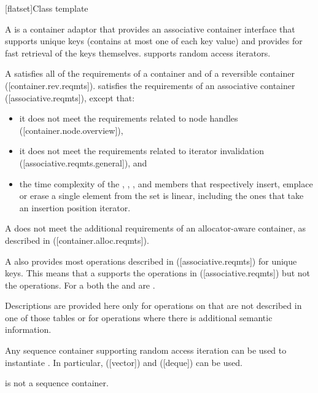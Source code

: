 \noindent\makebox[\linewidth]{\rule{\textwidth}{0.4pt}}

\begin{addedblock}
[flatset]{Class template }

\pnum
{}%
A  is a container adaptor that provides an associative
container interface that supports unique keys (contains at most one of each
key value) and provides for fast retrieval of the keys
themselves.  supports random access iterators.

\pnum
A  satisfies all of the requirements of a container and of a
reversible container ([container.rev.reqmts]).   satisfies
the requirements of an associative container ([associative.reqmts]), except
that:
\begin{itemize}
\item it does not meet the requirements related to node handles ([container.node.overview]),
\item it does not meet the requirements related to iterator invalidation ([associative.reqmts.general]), and
\item the time complexity of the , , ,
and  members that respectively insert, emplace or erase a single
element from the set is linear, including the ones that take an insertion
position iterator.
\end{itemize}
A  does not meet the additional requirements of an
allocator-aware container, as described in ([container.alloc.reqmts]).

\pnum
A  also provides most operations described
in ([associative.reqmts]) for unique keys.  This means that a
 supports the  operations
in ([associative.reqmts]) but not the  operations.  For a
 both the  and  are
.

\pnum
Descriptions are provided here only for operations on  that
are not described in one of those tables or for operations where there is
additional semantic information.

\pnum
Any sequence container supporting random access iteration can be used to
instantiate . In particular,  ([vector]) and
 ([deque]) can be used.  \begin{note} is
not a sequence container.\end{note}


\end{addedblock}
